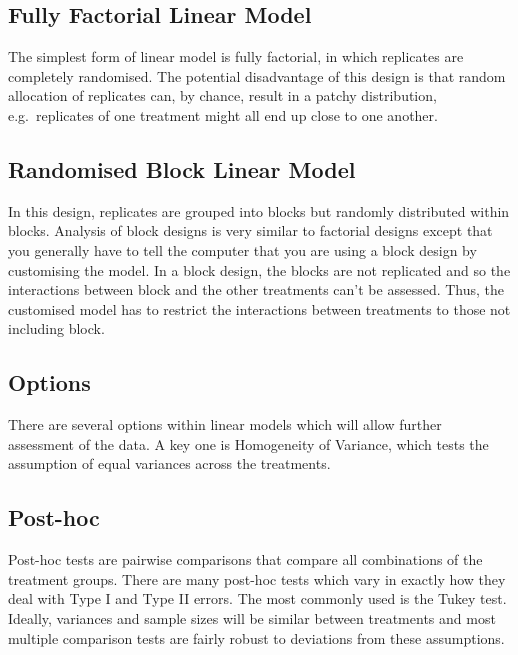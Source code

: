 \documentclass[
]{book}
\begin{document}
\hypertarget{fully-factorial-linear-model}{%
\subsection{Fully Factorial Linear Model}\label{fully-factorial-linear-model}}

The simplest form of linear model is fully factorial, in which replicates are completely randomised. The potential disadvantage of this design is that random allocation of replicates can, by chance, result in a patchy distribution, e.g.~replicates of one treatment might all end up close to one another.

\hypertarget{randomised-block-linear-model}{%
\subsection{Randomised Block Linear Model}\label{randomised-block-linear-model}}

In this design, replicates are grouped into blocks but randomly distributed within blocks. Analysis of block designs is very similar to factorial designs except that you generally have to tell the computer that you are using a block design by customising the model. In a block design, the blocks are not replicated and so the interactions between block and the other treatments can't be assessed. Thus, the customised model has to restrict the interactions between treatments to those not including block.

\hypertarget{options}{%
\subsection{Options}\label{options}}

There are several options within linear models which will allow further assessment of the data. A key one is Homogeneity of Variance, which tests the assumption of equal variances across the treatments.

\hypertarget{post-hoc}{%
\subsection{Post-hoc}\label{post-hoc}}

Post-hoc tests are pairwise comparisons that compare all combinations of the treatment groups. There are many post-hoc tests which vary in exactly how they deal with Type I and Type II errors. The most commonly used is the Tukey test. Ideally, variances and sample sizes will be similar between treatments and most multiple comparison tests are fairly robust to deviations from these assumptions.
\end{document}
